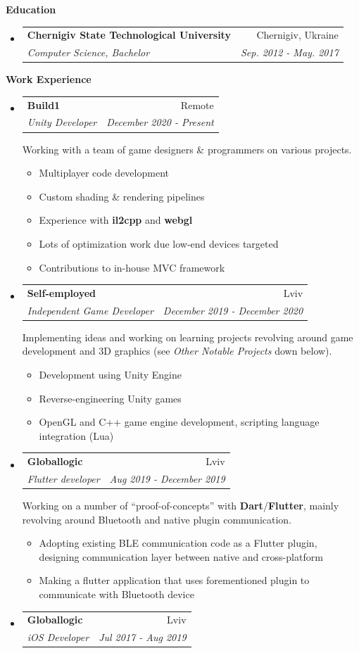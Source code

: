 \documentclass[letterpaper,11pt]{article}
\makeatletter
\newcommand{\resitem}[1]{\item #1 \vspace{-2pt}}
\newcommand{\resheading}[1]{{\vspace{.2in} \large \colorbox{mygrey}{\begin{minipage}{\textwidth}{\textbf{#1 \vphantom{p\^{E}}}}\end{minipage}}}}
\newcommand{\ressubheading}[4]{
\begin{tabular*}{7.1in}{l@{\extracolsep{\fill}}r}
		\textbf{#1} & #2 \\
		\textit{#3} & \textit{#4} \\
\end{tabular*}\vspace{-6pt}}
\makeatother
\begin{document}
\resheading{Education}
\begin{itemize}
\item
	\ressubheading{Chernigiv State Technological University}{Chernigiv, Ukraine}{Computer Science, Bachelor}{Sep. 2012 - May. 2017}
\end{itemize}

\resheading{Work Experience}
\begin{itemize}
	\item
		\ressubheading{Build1}{Remote}{Unity Developer}{December 2020 - Present}

		Working with a team of game designers \& programmers on various projects.
		\begin{itemize}
				\resitem{Multiplayer code development}
				\resitem{Custom shading \& rendering pipelines}
				\resitem{Experience with \textbf{il2cpp} and \textbf{webgl}}
				\resitem{Lots of optimization work due low-end devices targeted}
				\resitem{Contributions to in-house MVC framework}
		\end{itemize}

	\item
		\ressubheading{Self-employed}{Lviv}{Independent Game Developer}{December 2019 - December 2020}

		Implementing ideas and working on learning projects revolving around game development and 3D graphics (see \textit{Other Notable Projects} down below).
		\begin{itemize}
				\resitem{Development using Unity Engine}
				\resitem{Reverse-engineering Unity games}
				\resitem{OpenGL and C++ game engine development, scripting language integration (Lua)}
		\end{itemize}

	\item
		\ressubheading{Globallogic}{Lviv}{Flutter developer}{Aug 2019 - December 2019}
		
		Working on a number of ``proof-of-concepts'' with \textbf{Dart}/\textbf{Flutter}, mainly revolving around Bluetooth and native plugin communication.
		\begin{itemize}
				\resitem{Adopting existing BLE communication code as a Flutter plugin, designing communication layer between native and cross-platform}
				\resitem{Making a flutter application that uses forementioned plugin to communicate with Bluetooth device}
		\end{itemize}

	\pagebreak

	\item
		\ressubheading{Globallogic}{Lviv}{iOS Developer}{Jul 2017 - Aug 2019}


\end{itemize}
\end{document}
